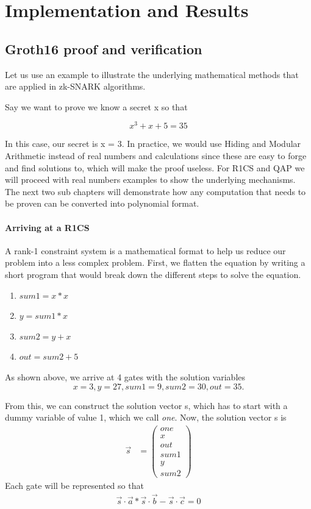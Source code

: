 \chapter{Implementation and Results}
\section{Groth16 proof and verification}
Let us use an example to illustrate the underlying mathematical methods that are applied in zk-SNARK algorithms. 

Say we want to prove we know a secret x so that

\[x^3 + x + 5 = 35\]

In this case, our secret is x = 3.
In practice, we would use Hiding and Modular Arithmetic instead of real numbers and calculations since these are easy to forge and find solutions to, which will make the proof useless. For R1CS and QAP we will proceed with real numbers examples to show the underlying mechanisms. The next two sub chapters will demonstrate how any computation that needs to be proven can be converted into polynomial format.

\subsubsection{Arriving at a R1CS}

A rank-1 constraint system is a mathematical format to help us reduce our problem into a less complex problem. First, we flatten the equation by writing a short program that would break down the different steps to solve the equation.

\begin{enumerate}
    \item \(sum1 = x * x\)
    \item \(y = sum1 * x\)
    \item \(sum2 = y + x\)
    \item \(out = sum2 + 5\)
\end{enumerate}

As shown above, we arrive at 4 gates with the solution variables
\[x = 3, y = 27, sum1 = 9, sum2 = 30, out = 35.\]

From this, we can construct the solution vector s, which has to start with a dummy variable of value 1, which we call \textit{one}.
Now, the solution vector s is
\begin{align}
    \Vec{s} &= \begin{pmatrix}
     one \\ x \\ out \\ sum1 \\ y \\ sum2
\end{pmatrix}
\end{align}
Each gate will be represented so that
\begin{align}
     \Vec{s}\cdot\Vec{a} * \Vec{s}\cdot\Vec{b} - \Vec{s}\cdot\Vec{c} = 0
\end{align}

